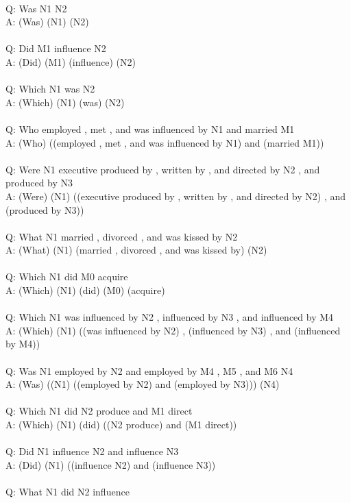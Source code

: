 \documentclass{article} \usepackage{iclr2022_conference,times}
\newcommand{\prompt}[1]{{\footnotesize \textsf{#1}}}
\begin{document}
\prompt{\\
Q: Was N1 N2 \\
A: (Was) (N1) (N2) \\
 \\
Q: Did M1 influence N2 \\
A: (Did) (M1) (influence) (N2) \\
 \\
Q: Which N1 was N2 \\
A: (Which) (N1) (was) (N2) \\
 \\
Q: Who employed , met , and was influenced by N1 and married M1 \\
A: (Who) ((employed , met , and was influenced by N1) and (married M1)) \\
 \\
Q: Were N1 executive produced by , written by , and directed by N2 , and produced by N3 \\
A: (Were) (N1) ((executive produced by , written by , and directed by N2) , and (produced by N3)) \\
 \\
Q: What N1 married , divorced , and was kissed by N2 \\
A: (What) (N1) (married , divorced , and was kissed by) (N2) \\
 \\
Q: Which N1 did M0 acquire \\
A: (Which) (N1) (did) (M0) (acquire) \\
 \\
Q: Which N1 was influenced by N2 , influenced by N3 , and influenced by M4 \\
A: (Which) (N1) ((was influenced by N2) , (influenced by N3) , and (influenced by M4)) \\
 \\
Q: Was N1 employed by N2 and employed by M4 , M5 , and M6 N4 \\
A: (Was) ((N1) ((employed by N2) and (employed by N3))) (N4) \\
 \\
Q: Which N1 did N2 produce and M1 direct \\
A: (Which) (N1) (did) ((N2 produce) and (M1 direct)) \\
 \\
Q: Did N1 influence N2 and influence N3 \\
A: (Did) (N1) ((influence N2) and (influence N3)) \\
 \\
Q: What N1 did N2 influence \\
}
\end{document}
